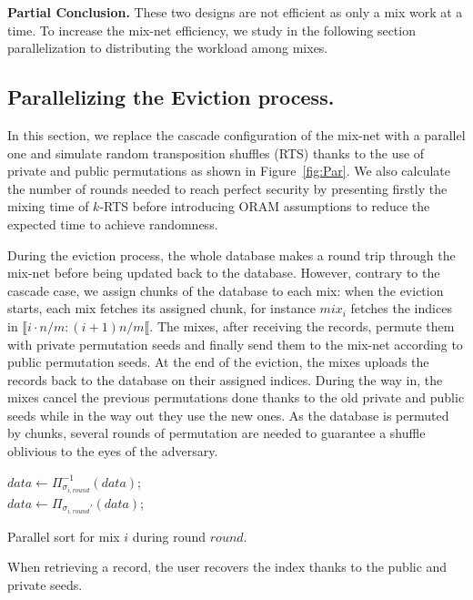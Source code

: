 \documentclass[USenglish,oneside,twocolumn]{article}
\begin{document}
\noindent\textbf{Partial Conclusion.} These two designs are not efficient as only a mix work at a time. To increase the mix-net efficiency, we study in the following section parallelization to distributing the workload among mixes.
% 
\subsection{Parallelizing the Eviction process.}\label{Parallel}
In this section, we replace the cascade configuration of the mix-net with a parallel one and simulate random transposition shuffles (RTS) thanks to the use of private and public permutations as shown in Figure~\ref{fig:Par}. We also calculate the number of rounds needed to reach perfect security by presenting firstly the mixing time of $k$-RTS before introducing ORAM assumptions to reduce the expected time to achieve randomness.

During the eviction process, the whole database makes a round trip through the mix-net before being updated back to the database. However, contrary to the cascade case, we assign chunks of the database to each mix: when the eviction starts, each mix fetches its assigned chunk, for instance $mix_i$ fetches the indices in $\llbracket i\cdot n/m : (i+1)n/m \llbracket$. The mixes, after receiving the records, permute them with private permutation seeds and finally send them to the mix-net according to public permutation seeds. At the end of the eviction, the mixes uploads the records back to the database on their assigned indices. During the way in, the mixes cancel the previous permutations done thanks to the old private and public seeds while in the way out they use the new ones. As the database is permuted by chunks, several rounds of permutation are needed to guarantee a shuffle oblivious to the eyes of the adversary.

\begin{algorithm}
\DontPrintSemicolon
{}
{
$data \gets \Pi^{-1}_{\sigma_{i,round}}\left ( data \right )$;\\
}
\Else
{
$data \gets \Pi_{\sigma_{i,round}'}\left ( data \right )$;\\
}
\caption{Parallel sort for mix $i$ during round $round$.}
\label{alg:PSort}
\end{algorithm}

When retrieving a record, the user recovers the index thanks to the public and private seeds.
\end{document}
